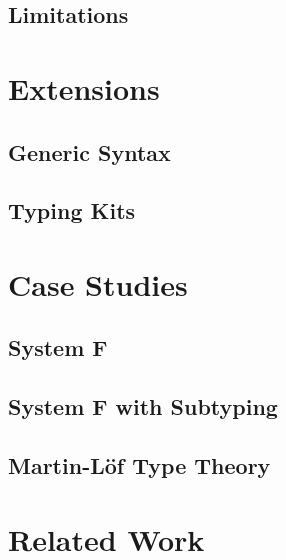 \documentclass[screen,nonacm]{acmart}
\begin{document}
\subsection{Limitations}\label{sec:ags-lim}

\section{Extensions}\label{sec:ext}
\subsection{Generic Syntax}\label{sec:ext-uni}
\subsection{Typing Kits}

\section{Case Studies}\label{sec:cas}
\subsection{System F}\label{sec:cas-sf}
\cite{girard1972}
\subsection{System F with Subtyping}\label{sec:cas-sfsub}

\subsection{Martin-Löf Type Theory}\label{sec:cas-mltt}

\section{Related Work}\label{sec:rel}

\end{document}
